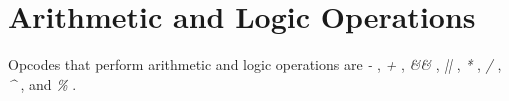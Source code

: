 \begin{comment}
\documentclass[10pt]{article}
\usepackage{fullpage, graphicx, url}
\setlength{\parskip}{1ex}
\setlength{\parindent}{0ex}
\title{Arithmetic and Logic Operations}



\begin{tabular}{ccc}
The Alternative Csound Reference Manual & & \\
Previous &Mathematical Operations &Next

\end{tabular}

\end{comment}
\section{Arithmetic and Logic Operations}


  Opcodes that perform arithmetic and logic operations are \emph{-}
, \emph{+}
, \emph{\&\&}
, \emph{||}
, \emph{*}
, \emph{/}
, \emph{\^{}}
, and \emph{\%}
. 


\begin{comment}
\begin{tabular}{lcr}
Previous &Home &Next \\
Mathematical Operations &Up &Mathematical Functions

\end{tabular}



\end{comment}
